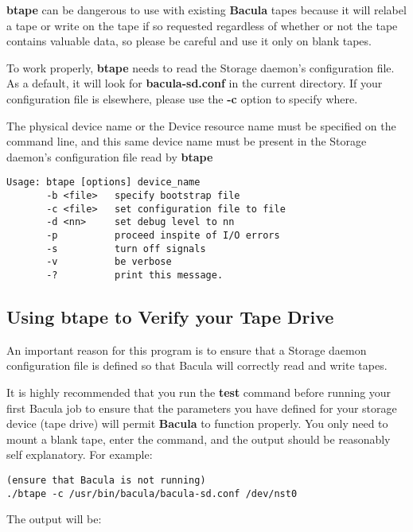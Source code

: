 {\bf btape} can be dangerous to use with existing {\bf Bacula} tapes because
it will relabel a tape or write on the tape if so requested regardless of
whether or not the tape contains valuable data, so please be careful and use
it only on blank tapes.

To work properly, {\bf btape} needs to read the Storage daemon's configuration
file. As a default, it will look for {\bf bacula-sd.conf} in the current
directory. If your configuration file is elsewhere, please use the {\bf -c}
option to specify where.

The physical device name or the Device resource name must be specified on the
command line, and this same device name must be present in the Storage
daemon's configuration file read by {\bf btape}

\footnotesize
\begin{verbatim}
Usage: btape [options] device_name
       -b <file>   specify bootstrap file
       -c <file>   set configuration file to file
       -d <nn>     set debug level to nn
       -p          proceed inspite of I/O errors
       -s          turn off signals
       -v          be verbose
       -?          print this message.
\end{verbatim}
\normalsize

\subsection{Using btape to Verify your Tape Drive}

An important reason for this program is to ensure that a Storage daemon
configuration file is defined so that Bacula will correctly read and write
tapes.

It is highly recommended that you run the {\bf test} command before running
your first Bacula job to ensure that the parameters you have defined for your
storage device (tape drive) will permit {\bf Bacula} to function properly. You
only need to mount a blank tape, enter the command, and the output should be
reasonably self explanatory. For example:

\footnotesize
\begin{verbatim}
(ensure that Bacula is not running)
./btape -c /usr/bin/bacula/bacula-sd.conf /dev/nst0
\end{verbatim}
\normalsize

The output will be:

